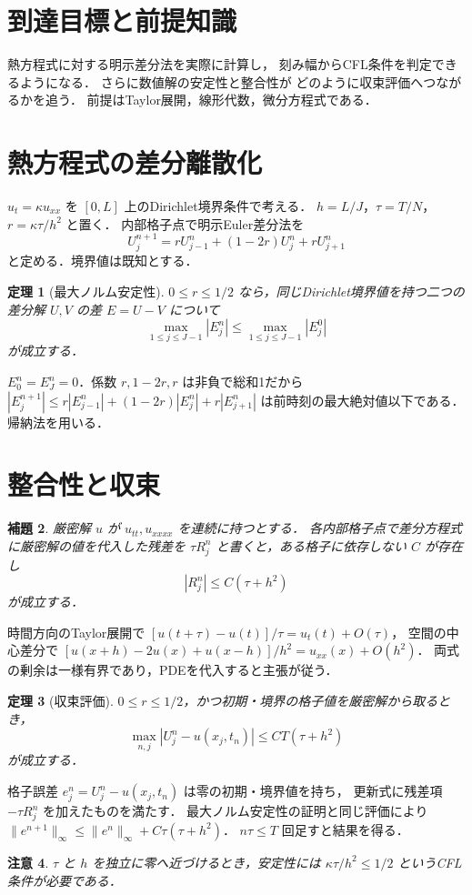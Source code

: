 \documentclass[a5paper,10pt,onecolumn]{jsarticle}
\makeatletter
\theoremstyle{mathnotetheorem}
\newtheorem{theorem}{定理}[section]
\newtheorem{lemma}[theorem]{補題}
\newtheorem{remark}[theorem]{注意}
\renewcommand{\proofname}{証明}
\renewenvironment{proof}[1][\proofname]{%
  \par\pushQED{\qed}\normalfont\topsep4\p@\@plus2\p@\relax
  \trivlist\item[\hskip\labelsep\bfseries #1]\ignorespaces
}{\popQED\endtrivlist\@endpefalse}
\newcommand{\norm}[1]{\lVert #1\rVert}
\makeatother
\begin{document}
\section*{到達目標と前提知識}
熱方程式に対する明示差分法を実際に計算し，
刻み幅からCFL条件を判定できるようになる．
さらに数値解の安定性と整合性が
どのように収束評価へつながるかを追う．
前提はTaylor展開，線形代数，微分方程式である．

\section{熱方程式の差分離散化}
$u_t=\kappa u_{xx}$ を $[0,L]$ 上のDirichlet境界条件で考える．
$h=L/J$，$\tau=T/N$，$r=\kappa\tau/h^2$ と置く．
内部格子点で明示Euler差分法を
\[
 U_j^{n+1}=rU_{j-1}^n+(1-2r)U_j^n+rU_{j+1}^n
\]
と定める．境界値は既知とする．
\begin{theorem}[最大ノルム安定性]
$0\le r\le1/2$ なら，同じDirichlet境界値を持つ二つの差分解
$U,V$ の差 $E=U-V$ について
\[
 \max_{1\le j\le J-1}|E_j^n|
 \le\max_{1\le j\le J-1}|E_j^0|
\]
が成立する．
\end{theorem}
\begin{proof}
$E_0^n=E_J^n=0$．係数 $r,1-2r,r$ は非負で総和1だから
$|E_j^{n+1}|\le r|E_{j-1}^n|+(1-2r)|E_j^n|+r|E_{j+1}^n|$
は前時刻の最大絶対値以下である．帰納法を用いる．
\end{proof}
\section{整合性と収束}
\begin{lemma}
厳密解 $u$ が $u_{tt},u_{xxxx}$ を連続に持つとする．
各内部格子点で差分方程式に厳密解の値を代入した残差を
$\tau R_j^n$ と書くと，ある格子に依存しない $C$ が存在し
\[
 |R_j^n|\le C(\tau+h^2)
\]
が成立する．
\end{lemma}
\begin{proof}
時間方向のTaylor展開で
$[u(t+\tau)-u(t)]/\tau=u_t(t)+O(\tau)$，
空間の中心差分で
$[u(x+h)-2u(x)+u(x-h)]/h^2=u_{xx}(x)+O(h^2)$．
両式の剰余は一様有界であり，PDEを代入すると主張が従う．
\end{proof}
\begin{theorem}[収束評価]
$0\le r\le1/2$，かつ初期・境界の格子値を厳密解から取るとき，
\[
 \max_{n,j}|U_j^n-u(x_j,t_n)|\le CT(\tau+h^2)
\]
が成立する．
\end{theorem}
\begin{proof}
格子誤差 $e_j^n=U_j^n-u(x_j,t_n)$ は零の初期・境界値を持ち，
更新式に残差項 $-\tau R_j^n$ を加えたものを満たす．
最大ノルム安定性の証明と同じ評価により
$\norm{e^{n+1}}_\infty\le\norm{e^n}_\infty+C\tau(\tau+h^2)$．
$n\tau\le T$ 回足すと結果を得る．
\end{proof}
\begin{remark}
$\tau$ と $h$ を独立に零へ近づけるとき，安定性には
$\kappa\tau/h^2\le1/2$ というCFL条件が必要である．
\end{remark}
\end{document}
